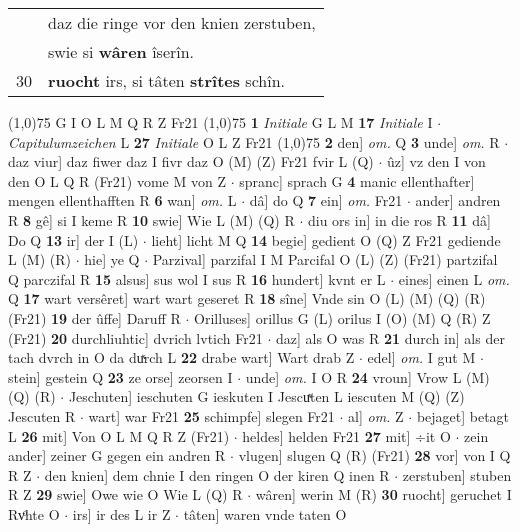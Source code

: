 \documentclass[8pt,a4paper,notitlepage]{article}
\begin{document}
\begin{table}[ht]
\begin{minipage}[t]{0.5\linewidth}
\begin{tabular}{rl}
 & daz die ringe vor den knien zerstuben,\\ 
 & swie si \textbf{wâren} îserîn.\\ 
30 & \textbf{ruocht} irs, si tâten \textbf{strîtes} schîn.\\ 
\end{tabular}
\scriptsize
\line(1,0){75} \newline
G I O L M Q R Z Fr21 \newline
\line(1,0){75} \newline
\textbf{1} \textit{Initiale} G L M  \textbf{17} \textit{Initiale} I   $\cdot$ \textit{Capitulumzeichen} L  \textbf{27} \textit{Initiale} O L Z Fr21  \newline
\line(1,0){75} \newline
\textbf{2} den] \textit{om.} Q \textbf{3} unde] \textit{om.} R  $\cdot$ daz viur] daz fiwer daz I fivr daz O (M) (Z) Fr21 fvir L (Q)  $\cdot$ ûz] vz den I von den O L Q R (Fr21) vome M von Z  $\cdot$ spranc] sprach G \textbf{4} manic ellenthafter] mengen ellenthafften R \textbf{6} wan] \textit{om.} L  $\cdot$ dâ] do Q \textbf{7} ein] \textit{om.} Fr21  $\cdot$ ander] andren R \textbf{8} gê] si I keme R \textbf{10} swie] Wie L (M) (Q) R  $\cdot$ diu ors in] in die ros R \textbf{11} dâ] Do Q \textbf{13} ir] der I (L)  $\cdot$ lieht] licht M Q \textbf{14} begie] gedient O (Q) Z Fr21 gediende L (M) (R)  $\cdot$ hie] ye Q  $\cdot$ Parzival] parzifal I M Parcifal O (L) (Z) (Fr21) partzifal Q parczifal R \textbf{15} alsus] sus wol I sus R \textbf{16} hundert] kvnt er L  $\cdot$ eines] einen L \textit{om.} Q \textbf{17} wart versêret] wart wart geseret R \textbf{18} sîne] Vnde sin O (L) (M) (Q) (R) (Fr21) \textbf{19} der ûffe] Daruff R  $\cdot$ Orilluses] orillus G (L) orilus I (O) (M) Q (R) Z (Fr21) \textbf{20} durchliuhtic] dvrich lvtich Fr21  $\cdot$ daz] als O was R \textbf{21} durch in] als der tach dvrch in O da duͯrch L \textbf{22} drabe wart] Wart drab Z  $\cdot$ edel] \textit{om.} I gut M  $\cdot$ stein] gestein Q \textbf{23} ze orse] zeorsen I  $\cdot$ unde] \textit{om.} I O R \textbf{24} vroun] Vrow L (M) (Q) (R)  $\cdot$ Jeschuten] ieschuten G ieskuten I Jescuͯten L iescuten M (Q) (Z) Jescuten R  $\cdot$ wart] war Fr21 \textbf{25} schimpfe] slegen Fr21  $\cdot$ al] \textit{om.} Z  $\cdot$ bejaget] betagt L \textbf{26} mit] Von O L M Q R Z (Fr21)  $\cdot$ heldes] helden Fr21 \textbf{27} mit] ÷it O  $\cdot$ zein ander] zeiner G gegen ein andren R  $\cdot$ vlugen] slugen Q (R) (Fr21) \textbf{28} vor] von I Q R Z  $\cdot$ den knien] dem chnie I den ringen O der kiren Q inen R  $\cdot$ zerstuben] stuben R Z \textbf{29} swie] Owe wie O Wie L (Q) R  $\cdot$ wâren] werin M (R) \textbf{30} ruocht] geruchet I Rvͦhte O  $\cdot$ irs] ir des L ir Z  $\cdot$ tâten] waren vnde taten O \newline

\end{minipage}
\end{table}
\end{document}
